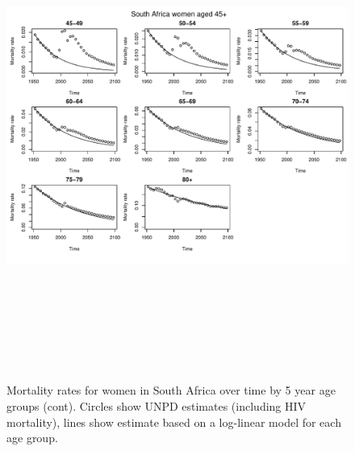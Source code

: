 \documentclass{article}
\begin{document}
\begin{figure}
\includegraphics[width=16cm,height=16cm]{EstimatingRatesFromUNPD-MortalitySAWomen2} 

\caption{Mortality rates for women in South Africa over time by 5 year age groups (cont). Circles show UNPD estimates (including HIV mortality), lines show estimate based on a log-linear model for each age group.}
\label{MortalitySAmen1}
\end{figure}
\end{document}
